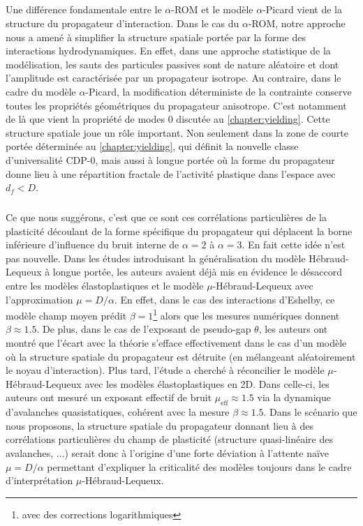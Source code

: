 \subparagraph{}Une différence fondamentale entre le $\alpha$-ROM et le modèle $\alpha$-Picard vient de la structure du propagateur d'interaction. Dans le cas du $\alpha$-ROM, notre approche nous a amené à simplifier la structure spatiale portée par la forme des interactions hydrodynamiques. En effet, dans une approche statistique de la modélisation, les sauts des particules passives sont de nature aléatoire et dont l'amplitude est caractérisée par un propagateur isotrope. Au contraire, dans le cadre du modèle $\alpha$-Picard, la modification déterministe de la contrainte conserve toutes les propriétés géométriques du propagateur anisotrope. C'est notamment de là que vient la propriété de modes 0 discutée au \autoref{chapter:yielding}. Cette structure spatiale joue un rôle important. Non seulement dans la zone de courte portée déterminée au \autoref{chapter:yielding}, qui définit la nouvelle classe d'universalité CDP-0, mais aussi à longue portée où la forme du propagateur donne lieu à une répartition fractale de l'activité plastique dans l'espace avec $d_f < D$.

\subparagraph{}Ce que nous suggérons, c'est que ce sont ces corrélations particulières de la plasticité découlant de la forme spécifique du propagateur qui déplacent la borne inférieure d’influence du bruit interne de $\alpha = 2$ à $\alpha = 3$. En fait cette idée n'est pas nouvelle. Dans les études \cite{lin_mean-field_2016, lin_microscopic_2018} introduisant la généralisation du modèle Hébraud-Lequeux à longue portée, les auteurs avaient déjà mis en évidence le désaccord entre les modèles élastoplastiques et le modèle $\mu$-Hébraud-Lequeux avec l'approximation $\mu = D/\alpha$. En effet, dans le cas des interactions d'Eshelby, ce modèle champ moyen prédit $\beta = 1$\footnote{avec des corrections logarithmiques} alors que les mesures numériques donnent $\beta \approx 1.5$. De plus, dans le cas de l'exposant de pseudo-gap $\theta$, les auteurs ont montré que l'écart avec la théorie s'efface effectivement dans le cas d'un modèle où la structure spatiale du propagateur est détruite (en mélangeant aléatoirement le noyau d'interaction). Plus tard, l'étude \cite{ferrero_criticality_2019} a cherché à réconcilier le modèle $\mu$-Hébraud-Lequeux avec les modèles élastoplastiques en 2D. Dans celle-ci, les auteurs ont mesuré un exposant effectif de bruit $\mu_\text{eff}\approx 1.5$ via la dynamique d'avalanches quasistatiques, cohérent avec la mesure $\beta \approx 1.5$. Dans le scénario que nous proposons, la structure spatiale du propagateur donnant lieu à des corrélations particulières du champ de plasticité (structure quasi-linéaire des avalanches, ...) serait donc à l'origine d'une forte déviation à l'attente naïve $\mu = D/\alpha$ permettant d'expliquer la criticalité des modèles toujours dans le cadre d'interprétation $\mu$-Hébraud-Lequeux.

